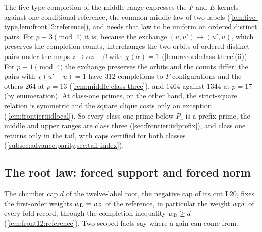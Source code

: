 The five-type completion of the middle range expresses the $F$ and $E$ kernels
against one conditional reference, the common middle law of two labels
(\cref{lem:five-type,lem:front12:reference}), and needs that law to be uniform on
ordered distinct pairs. For $p\equiv3\pmod4$ it is, because the exchange
$(u,u')\mapsto(u',u)$, which preserves the completion counts, interchanges the
two orbits of ordered distinct pairs under the maps $z\mapsto\alpha z+\beta$ with
$\chi(\alpha)=1$ (\cref{lem:record:class-three}(ii)). For $p\equiv1\pmod4$ the exchange preserves
the orbits and the counts differ: the pairs with $\chi(u'-u)=1$ have $312$ completions to $F$-configurations and the others $264$ at $p=13$ (\cref{rem:middle-class-three}), and
$1464$ against $1344$ at $p=17$ (by enumeration). At class-one primes, on the
other hand, the strict-square relation is symmetric and the square clique costs
only an exception (\cref{lem:frontier:iidlocal}). So every class-one prime below
$P_4$ is a prefix prime, the middle and upper ranges are class three
(\cref{sec:frontier:iidprefix}), and class one returns only in the tail, with
caps certified for both classes (\cref{subsec:advance:parity,sec:tail-index}).

\subsection{The root law: forced support and forced norm}\label{subsec:obs:root}

The chamber cap $d$ of the twelve-label root, the negative cap of its cut L20,
fixes the first-order weights $w_{\rm D}=w_{\rm S}$ of the reference, in
particular the weight $w_{\rm D}r$ of every fold record, through the completion
inequality $w_{\rm D}\ge d$ (\cref{lem:front12:reference}). Two scoped facts say
where a gain can come from.

